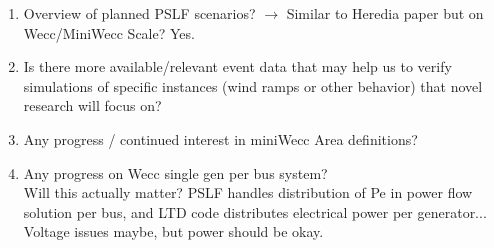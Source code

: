 \documentclass[12pt]{article}
\begin{document}
\begin{multicols}{2}
\begin{enumerate}
		\item Overview of planned PSLF scenarios? $\rightarrow$ Similar to Heredia paper but on Wecc/MiniWecc Scale? Yes.
		
		\item Is there more available/relevant event data that may help us to verify simulations of specific instances (wind ramps or other behavior) that novel research will focus on? %

		\item  Any progress / continued interest in miniWecc Area definitions?

		\item Any progress on Wecc single gen per bus system?
		\\ Will this actually matter? PSLF handles distribution of Pe in power flow solution per bus, and LTD code distributes electrical power per generator... Voltage issues maybe, but power should be okay.
		
		
	\end{enumerate}

\vfill\null

\end{multicols}
	\begin{comment}
\pagebreak

\begin{landscape}
\begin{centering}
\vspace{-1em}
\end{centering}
\vspace{-1em}
\paragraph{.ltd File Example:}
\begin{Verbatim}
# LTD simulation models / perturbances 
# Commented and empty lines are ignored during parsing.
# Double quoted variable names in model parameters also ignored

# pgov1  busnum busnam basekv id : #9 mwcap droop k1
#pgov1   21 "21" 22.00 "1 " : #9 mwcap=100.0 "droop" 0.05 "k1" 1.0
pgov1   11 "11" 22.00 "1 " : #9 mwcap=100.0 0.05 1.0

# Perturbances
# target bus id(optional) : pertType attribute time val abs(optional)
load 3 : "pertType" step  "pertTarget" p "startTime" 21 "newVal" -1 rel
load 3 : "pertType" ramp "pertTarget" p "startTime" 2 "RAtime" 5 "RAval" -2 "holdtime" 3 "RBtime" 3 "RBval" 3
\end{Verbatim}
\end{landscape}

 	place for comments

	\end{comment}
\end{document}
